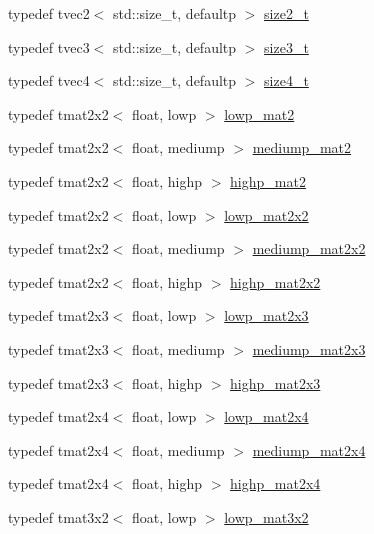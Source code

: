 \begin{DoxyCompactItemize}
\item 
typedef tvec2$<$ std\+::size\+\_\+t, defaultp $>$ \hyperlink{group__gtx__std__based__type_ga47b1e2bca519b02eb8500a240216b5de}{size2\+\_\+t}
\item 
typedef tvec3$<$ std\+::size\+\_\+t, defaultp $>$ \hyperlink{group__gtx__std__based__type_ga689991bc66c16637f043ade5cbb87260}{size3\+\_\+t}
\item 
typedef tvec4$<$ std\+::size\+\_\+t, defaultp $>$ \hyperlink{group__gtx__std__based__type_gaa4f69cfac1c3e014a50fd090974092ec}{size4\+\_\+t}
\item 
typedef tmat2x2$<$ float, lowp $>$ \hyperlink{namespaceglm_a4dcbb9d31820068d967a8a23086d360a}{lowp\+\_\+mat2}
\item 
typedef tmat2x2$<$ float, mediump $>$ \hyperlink{namespaceglm_a62712eb89ac9c8906f6cd76758774b33}{mediump\+\_\+mat2}
\item 
typedef tmat2x2$<$ float, highp $>$ \hyperlink{namespaceglm_ac77ecf54fde34e33f934c6876ad807b3}{highp\+\_\+mat2}
\item 
typedef tmat2x2$<$ float, lowp $>$ \hyperlink{namespaceglm_a0aa7aecd379954a906b6264cb4ffb788}{lowp\+\_\+mat2x2}
\item 
typedef tmat2x2$<$ float, mediump $>$ \hyperlink{namespaceglm_ad5969af533ebdd30e37827c82420fd65}{mediump\+\_\+mat2x2}
\item 
typedef tmat2x2$<$ float, highp $>$ \hyperlink{namespaceglm_a2819dad225ade63363e44d40b9935532}{highp\+\_\+mat2x2}
\item 
typedef tmat2x3$<$ float, lowp $>$ \hyperlink{namespaceglm_ad67cb8aff109d9873b8a96f2725bafe1}{lowp\+\_\+mat2x3}
\item 
typedef tmat2x3$<$ float, mediump $>$ \hyperlink{namespaceglm_a51aef59ca67585f2aecfb79b90836fd0}{mediump\+\_\+mat2x3}
\item 
typedef tmat2x3$<$ float, highp $>$ \hyperlink{namespaceglm_a5fd3b253d3fb12f78e286a7d90905631}{highp\+\_\+mat2x3}
\item 
typedef tmat2x4$<$ float, lowp $>$ \hyperlink{namespaceglm_adf454172b6c1e1288d7d003316b55c01}{lowp\+\_\+mat2x4}
\item 
typedef tmat2x4$<$ float, mediump $>$ \hyperlink{namespaceglm_a7cfc44ca56d3efb0c65a64ed359e6ec4}{mediump\+\_\+mat2x4}
\item 
typedef tmat2x4$<$ float, highp $>$ \hyperlink{namespaceglm_aa1e8839e63b86df92204fc1c4a25dd39}{highp\+\_\+mat2x4}
\item 
typedef tmat3x2$<$ float, lowp $>$ \hyperlink{namespaceglm_adeaba732d325eca39068acf99c877b05}{lowp\+\_\+mat3x2}

\end{DoxyCompactItemize}
